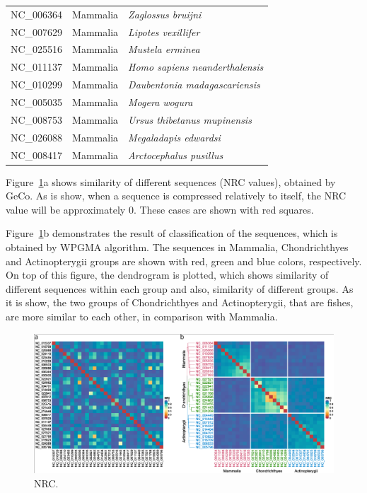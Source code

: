 \documentclass[extendedabs]{recpad2k}
\begin{document}
\begin{table}
\begin{tabular}{lll}
      NC\_006364 & Mammalia & \textit{Zaglossus bruijni} \\
      NC\_007629 & Mammalia & \textit{Lipotes vexillifer} \\
      NC\_025516 & Mammalia & \textit{Mustela erminea} \\
      NC\_011137 & Mammalia & \textit{Homo sapiens neanderthalensis} \\
      NC\_010299 & Mammalia & \textit{Daubentonia madagascariensis} \\
      NC\_005035 & Mammalia & \textit{Mogera wogura} \\
      NC\_008753 & Mammalia & \textit{Ursus thibetanus mupinensis} \\
      NC\_026088 & Mammalia & \textit{Megaladapis edwardsi} \\
      NC\_008417 & Mammalia & \textit{Arctocephalus pusillus} \\
      \hline
   \end{tabular}
   
\end{table}

Figure~\ref{fig.nrc}a shows similarity of different sequences (NRC values), obtained by GeCo. As is show, when a sequence is compressed relatively to itself, the NRC value will be approximately 0. These cases are shown with red squares.

Figure~\ref{fig.nrc}b demonstrates the result of classification of the sequences, which is obtained by WPGMA algorithm. The sequences in Mammalia, Chondrichthyes and Actinopterygii groups are shown with red, green and blue colors, respectively. On top of this figure, the dendrogram is plotted, which shows similarity of different sequences within each group and also, similarity of different groups. As it is show, the two groups of Chondrichthyes and Actinopterygii, that are fishes, are more similar to each other, in comparison with Mammalia.

\begin{figure}[t!]
   \includegraphics[width=\textwidth]{fig.pdf}
   \caption{NRC.}
   \label{fig.nrc}
\end{figure}



\end{document}
